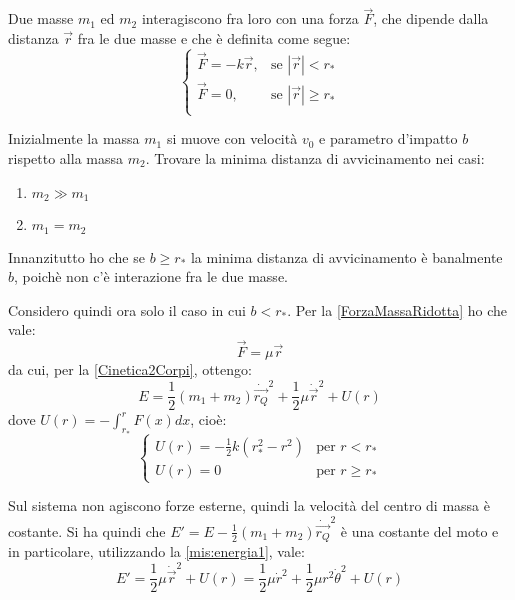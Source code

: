 \documentclass[../main.tex]{subfiles}
\begin{document}
\textex
Due masse $m_1$ ed $m_2$ interagiscono fra loro con una forza $\vec F$, che dipende dalla distanza $\vec r$ fra le due masse e che è definita come segue:
\begin{equation*}
\begin{cases}
	\vec F=-k\vec r, &\mbox{se } |\vec r|<r_*\\
	\vec F=0, & \mbox{se } |\vec r|\ge r_*\\
\end{cases}
\end{equation*}

Inizialmente la massa $m_1$ si muove con velocità $v_0$ e parametro d'impatto $b$ rispetto alla massa $m_2$.
Trovare la minima distanza di avvicinamento nei casi:
\begin{enumerate}
	\item $m_2\gg m_1$
	\item $m_1=m_2$
\end{enumerate}

\solution
Innanzitutto ho che se $b\ge r_*$ la minima distanza di avvicinamento è banalmente $b$, poichè non c'è interazione fra le due masse.

Considero quindi ora solo il caso in cui $b<r_*$. 
Per la \cref{ForzaMassaRidotta} ho che vale:
\begin{equation*}
	\vec F=\mu \vec r
\end{equation*}
da cui, per la \cref{Cinetica2Corpi}, ottengo:
\begin{equation}\label{mis:energia1}
	E=\frac12(m_1+m_2)\dot{\overrightarrow{r_Q}}^2+\frac12\mu\dot{\vec{r}}^2+U(r)
\end{equation}
dove $U(r)=-\int_{r_*}^r F(x) dx$, cioè:
\begin{equation*}
	\begin{cases}
		U(r)=-\frac12k(r_*^2-r^2) &\mbox{per } r<r_*\\
		U(r)=0 &\mbox{per } r\ge r_*
	\end{cases}
\end{equation*}

Sul sistema non agiscono forze esterne, quindi la velocità del centro di massa è costante.
Si ha quindi che $E'=E-\frac12(m_1+m_2)\dot{\overrightarrow{r_Q}}^2$ è una costante del moto e in particolare, utilizzando la \cref{mis:energia1}, vale:
\begin{equation}\label{mis:energia2}
	E'=\frac12\mu\dot{\vec{r}}^2+U(r)=\frac12\mu\dot r^2+\frac12\mu r^2\dot \theta^2+U(r)
\end{equation}
\end{document}
